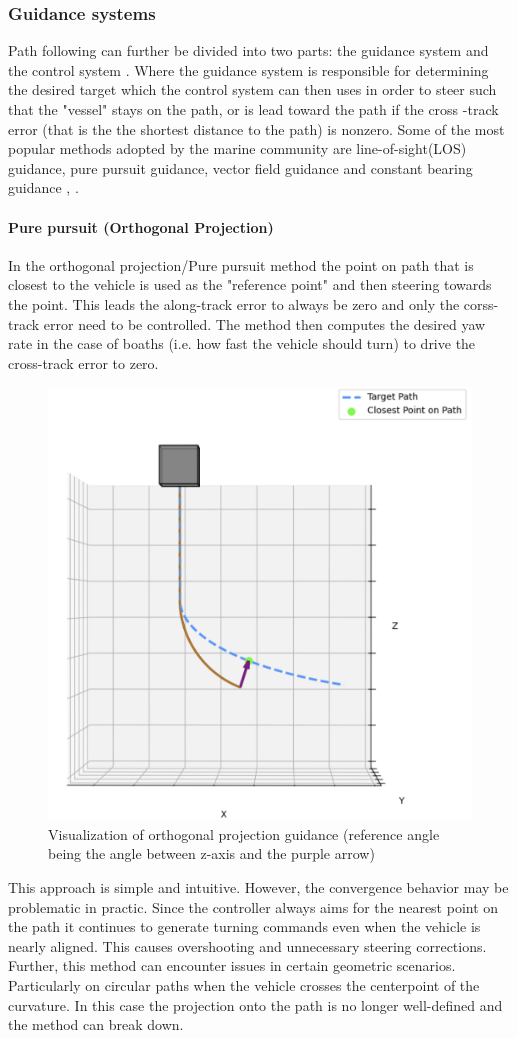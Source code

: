 \subsubsection{Guidance systems}
Path following can further be divided into two parts: the guidance system and the control system \cite{qi_curve_2022}. Where the guidance system is responsible for determining the desired target which the control system can then uses in order to steer such that the "vessel" stays on the path, or is lead toward the path if the cross -track error (that is the the shortest distance to the path) is nonzero. Some of the most popular methods adopted by the marine community are line-of-sight(LOS) guidance, pure pursuit guidance, vector field guidance and constant bearing guidance \cite{qi_curve_2022}, \cite{lekkas_integral_2014}. 

\paragraph*{Pure pursuit (Orthogonal Projection)}
In the orthogonal projection/Pure pursuit method the point on path that is closest to the vehicle is used as the "reference point" and then steering towards the point. This leads the along-track error to always be zero and only the corss-track error need to be controlled. The method then computes the desired yaw rate in the case of boaths (i.e. how fast the vehicle should turn) to drive the cross-track error to zero. 
\begin{figure} [H]
    \centering
    \includegraphics[width=0.7\linewidth]{images/pythonpictures/purepursuit.png}
    \caption{Visualization of orthogonal projection guidance (reference angle being the angle between z-axis and the purple arrow)}
    \label{fig:purepursuit}
\end{figure}
This approach is simple and intuitive. However, the convergence behavior may be problematic in practic. Since the controller always aims for the nearest point on the path it continues to generate turning commands even when the vehicle is nearly aligned. This causes overshooting and unnecessary steering corrections. Further, this method can encounter issues in certain geometric scenarios. Particularly on circular paths when the vehicle crosses the centerpoint of the curvature. In this case the projection onto the path is no longer well-defined and the method can break down.


